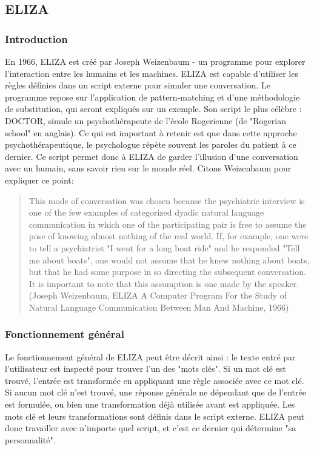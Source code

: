 \documentclass[11pt, a4paper]{report}
\begin{document}
    \subsection*{ELIZA}
      \subsubsection*{Introduction}
En 1966, ELIZA est créé par Joseph Weizenbaum - un programme pour explorer l'interaction entre les humains et 
les machines. ELIZA est capable d'utiliser les règles définies dans un script externe pour simuler 
une conversation. Le programme repose sur l'application de pattern-matching et d'une 
méthodologie de substitution, qui seront expliqués sur un exemple.
Son script le plus célèbre : DOCTOR, simule un psychothérapeute de l'école Rogerienne
(de "Rogerian school" en anglais). Ce qui est important à retenir est que dans cette approche 
psychothérapeutique, le psychologue répète souvent les paroles du patient à ce dernier. 
Ce script permet donc à ELIZA de garder l'illusion d'une conversation avec un humain, 
sans savoir rien sur le monde réel. Citons Weizenbaum pour expliquer ce point:

\begin{quote}
  This mode of conversation was chosen because the psychiatric interview is one of the 
  few examples of categorized dyadic natural 
  language communication in which one of the participating pair is free to assume the pose 
  of knowing almost nothing of the real world. If, for example, one were to tell a 
  psychiatrist "I went for a long boat ride" and he responded "Tell me about boats", 
  one would not assume that he knew nothing about boats, but that he had some purpose 
  in so directing the subsequent conversation. It is important to note that this 
  assumption is one made by the speaker. (Joseph Weizenbaum, ELIZA A Computer Program
  For the Study of Natural Language
  Communication Between Man
  And Machine, 1966)
\end{quote} 

      \subsubsection*{Fonctionnement général}
Le fonctionnement général de ELIZA peut être décrit ainsi : le texte entré par l'utilisateur 
est inspecté pour trouver l'un des "mots clés". Si un mot clé est trouvé, l'entrée est transformée 
en appliquant une règle associée avec ce mot clé. Si aucun mot clé n'est trouvé, une réponse générale 
ne dépendant que de l'entrée est formulée, ou bien une transformation déjà utilisée avant est appliquée. 
Les mots clé et leurs transformations sont définis dans le script externe. ELIZA peut donc travailler 
avec n'importe quel script, et c'est ce dernier qui détermine "sa personnalité". 
\end{document}
